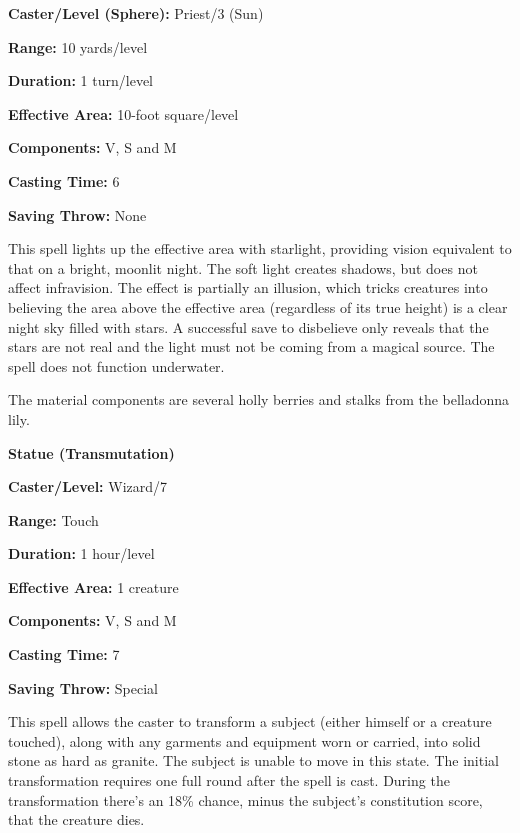 \begin{multicols}{2}
\begin{minipage}{\columnwidth}
\noindent \textbf{Caster/Level (Sphere):} Priest/3 (Sun)

\noindent \textbf{Range:} 10 yards/level

\noindent \textbf{Duration:} 1 turn/level

\noindent \textbf{Effective Area:} 10-foot square/level

\noindent \textbf{Components:} V, S and M

\noindent \textbf{Casting Time:} 6

\noindent \textbf{Saving Throw:} None

\end{minipage}

This spell lights up the effective area with starlight, providing vision equivalent to that on a bright, moonlit night.  The soft light creates shadows, but does not affect infravision.  The effect is partially an illusion, which tricks creatures into believing the area above the effective area (regardless of its true height) is a clear night sky filled with stars.  A successful save to disbelieve only reveals that the stars are not real and the light must not be coming from a magical source.  The spell does not function underwater.

The material components are several holly berries and stalks from the belladonna lily.

\vspace{1em}

\noindent
\begin{minipage}{\columnwidth}

\noindent \textbf{Statue (Transmutation)}

\noindent \textbf{Caster/Level:} Wizard/7

\noindent \textbf{Range:} Touch

\noindent \textbf{Duration:} 1 hour/level

\noindent \textbf{Effective Area:} 1 creature

\noindent \textbf{Components:} V, S and M

\noindent \textbf{Casting Time:} 7

\noindent \textbf{Saving Throw:} Special

\end{minipage}

This spell allows the caster to transform a subject (either himself or a creature touched), along with any garments and equipment worn or carried, into solid stone as hard as granite.  The subject is unable to move in this state.  The initial transformation requires one full round after the spell is cast.  During the transformation there's an 18\% chance, minus the subject's constitution score, that the creature dies.


\end{multicols}
